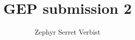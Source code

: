 \documentclass[12pt]{article}
\title{GEP submission 2}
\author{Zephyr Serret Verbist}
\theoremstyle{definition}
\begin{document}
\begin{titlepage}

\end{titlepage}

\renewcommand*\contentsname{Table of contents}
\tableofcontents
\listoffigures
\listoftables
\newpage










\newpage
%


\end{document}
